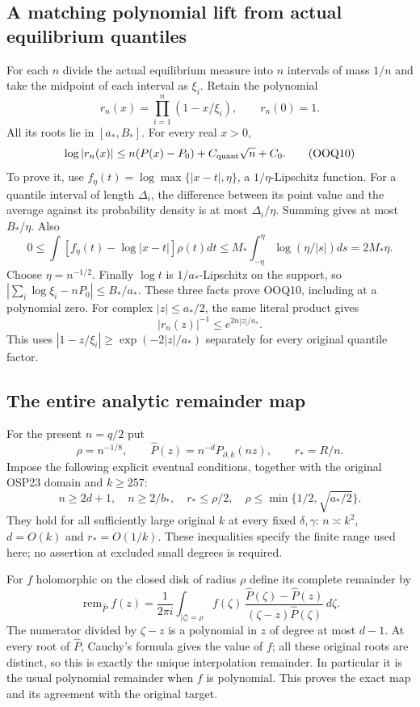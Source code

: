 \documentclass[11pt,a4paper]{article}
\begin{document}
\subsection{A matching polynomial lift from actual equilibrium quantiles}

For each $n$ divide the actual equilibrium measure into $n$
intervals of mass $1/n$ and take the midpoint of each interval
as $\xi_i$. Retain the polynomial
\[
 r_n(x)=\prod_{i=1}^n(1-x/\xi_i),\qquad r_n(0)=1.
 \tag{OOQ9}
\]
All its roots lie in $[a_*,B_*]$. For every real $x>0$,
\[
 \log|r_n(x)|\le n(P(x)-P_0)+C_{\rm quant}\sqrt n+C_0.
 \tag{OOQ10}
\]
To prove it, use $f_\eta(t)=\log\max\{|x-t|,\eta\}$, a
$1/\eta$-Lipschitz function. For a quantile interval of length
$\Delta_i$, the difference between its point value and the
average against its probability density is at most
$\Delta_i/\eta$. Summing gives at most $B_*/\eta$.
Also
\[
0\le\int[f_\eta(t)-\log|x-t|]\rho(t)dt
\le M_*\int_{-\eta}^{\eta}\log(\eta/|s|)ds=2M_*\eta .
\]
Choose $\eta=n^{-1/2}$. Finally $\log t$ is
$1/a_*$-Lipschitz on the support, so
$|\sum_i\log\xi_i-nP_0|\le B_*/a_*$. These three facts
prove OOQ10, including at a polynomial zero.
For complex $|z|\le a_*/2$, the same literal product gives
\[
 |r_n(z)|^{-1}\le e^{2n|z|/a_*}.
 \tag{OOQ11}
\]
This uses $|1-z/\xi_i|\ge\exp(-2|z|/a_*)$ separately
for every original quantile factor.

\subsection{The entire analytic remainder map}

For the present $n=q/2$ put
\[
 \rho=n^{-1/8},\qquad
 \widehat P(z)=n^{-d}P_{\partial,k}(nz),\qquad r_*=R/n.
 \tag{OOQ12}
\]
Impose the following explicit eventual conditions, together
with the original OSP23 domain and $k\ge257$:
\[
 n\ge2d+1,\quad n\ge2/b_*,
 \quad r_*\le\rho/2,\quad
 \rho\le\min\{1/2,\sqrt{a_*/2}\}.
 \tag{OOQ13}
\]
They hold for all sufficiently large original $k$ at every fixed
$\delta,\gamma$: $n\asymp k^2$, $d=O(k)$ and $r_*=O(1/k)$.
These inequalities specify the finite range used here; no
assertion at excluded small degrees is required.

For $f$ holomorphic on the closed disk of radius $\rho$ define
its complete remainder by
\[
\operatorname{rem}_{\widehat P}f(z)=
\frac1{2\pi i}\int_{|\zeta|=\rho}
 f(\zeta)\,
 \frac{\widehat P(\zeta)-\widehat P(z)}
      {(\zeta-z)\widehat P(\zeta)}\,d\zeta .
 \tag{OOQ14}
\]
The numerator divided by $\zeta-z$ is a polynomial in $z$
of degree at most $d-1$. At every root of $\widehat P$,
Cauchy's formula gives the value of $f$; all these original
roots are distinct, so this is exactly the unique interpolation
remainder. In particular it is the usual polynomial remainder
when $f$ is polynomial. This proves the exact map and its
agreement with the original target.
\end{document}
